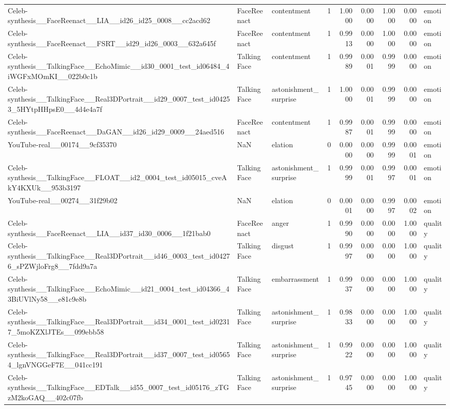 \begin{tabular}{lllrrrrrl}
Celeb-synthesis__FaceReenact__LIA__id26_id25_0008__cc2acd62 & FaceReenact & contentment & 1 & 1.0000 & 0.0000 & 1.0000 & 0.0000 & emotion \\
Celeb-synthesis__FaceReenact__FSRT__id29_id26_0003__632a645f & FaceReenact & contentment & 1 & 0.9913 & 0.0000 & 1.0000 & 0.0000 & emotion \\
Celeb-synthesis__TalkingFace__EchoMimic__id30_0001_test_id06484_4iWGFxMOmKI__022b0c1b & TalkingFace & contentment & 1 & 0.9989 & 0.0001 & 0.9999 & 0.0000 & emotion \\
Celeb-synthesis__TalkingFace__Real3DPortrait__id29_0007_test_id04253_5HYtpHHpsE0__4d4e4a7f & TalkingFace & astonishment_surprise & 1 & 1.0000 & 0.0001 & 0.9999 & 0.0000 & emotion \\
Celeb-synthesis__FaceReenact__DaGAN__id26_id29_0009__24aed516 & FaceReenact & contentment & 1 & 0.9987 & 0.0001 & 0.9999 & 0.0000 & emotion \\
YouTube-real__00174__9cf35370 & NaN & elation & 0 & 0.0000 & 0.0000 & 0.9999 & 0.0001 & emotion \\
Celeb-synthesis__TalkingFace__FLOAT__id2_0004_test_id05015_cveAkY4KXUk__953b3197 & TalkingFace & astonishment_surprise & 1 & 0.9999 & 0.0001 & 0.9997 & 0.0001 & emotion \\
YouTube-real__00274__31f29b02 & NaN & elation & 0 & 0.0001 & 0.0000 & 0.9997 & 0.0002 & emotion \\
Celeb-synthesis__FaceReenact__LIA__id37_id30_0006__1f21bab0 & FaceReenact & anger & 1 & 0.9990 & 0.0000 & 0.0000 & 1.0000 & quality \\
Celeb-synthesis__TalkingFace__Real3DPortrait__id46_0003_test_id04276_sPZWjloFrg8__7fdd9a7a & TalkingFace & disgust & 1 & 0.9997 & 0.0000 & 0.0000 & 1.0000 & quality \\
Celeb-synthesis__TalkingFace__EchoMimic__id21_0004_test_id04366_43BiUVlNy58__e81c9e8b & TalkingFace & embarrassment & 1 & 0.9937 & 0.0000 & 0.0000 & 1.0000 & quality \\
Celeb-synthesis__TalkingFace__Real3DPortrait__id34_0001_test_id02317_5moKZXlJTEs__099ebb58 & TalkingFace & astonishment_surprise & 1 & 0.9833 & 0.0000 & 0.0000 & 1.0000 & quality \\
Celeb-synthesis__TalkingFace__Real3DPortrait__id37_0007_test_id05654_lgnVNGGeF7E__041cc191 & TalkingFace & astonishment_surprise & 1 & 0.9922 & 0.0000 & 0.0000 & 1.0000 & quality \\
Celeb-synthesis__TalkingFace__EDTalk__id55_0007_test_id05176_zTGzM2koGAQ__402c07fb & TalkingFace & astonishment_surprise & 1 & 0.9745 & 0.0000 & 0.0000 & 1.0000 & quality \\

\end{tabular}
